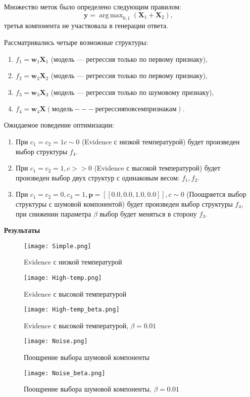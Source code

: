 \documentclass[12pt]{article}
\DeclareMathOperator*{\argmax}{arg\,max}
\begin{document}
Множество меток было определено следующим правилом:
\[
    \mathbf{y}= \argmax_{0,1} (\mathbf{X}_1 + \mathbf{X}_2),
\]
третья компонента не участвовала в генерации ответа.

Рассматривались четыре возможные структуры:
\begin{enumerate}
\item $f_1 = \mathbf{w}_1 \mathbf{X}_1$ (модель --- регрессия только по первому признаку), 

\item $f_2 = \mathbf{w}_2 \mathbf{X}_2$ (модель --- регрессия только по первому признаку), 

\item $f_3 = \mathbf{w}_3 \mathbf{X}_3$ (модель --- регрессия только по шумовому признаку), 

\item $f_4 = \mathbf{w}_4 \mathbf{X} (модель --- регрессия по всем признакам). $
\end{enumerate}

Ожидаемое поведение оптимизации:
\begin{enumerate}
\item При $c_1 = c_2 = 1 c \sim 0$ (Evidence с низкой температурой) будет произведен выбор структуры $f_4$.

\item При $c_1 = c_2 = 1, c >>0$ (Evidence с высокой температурой) будет произведен выбор двух структур с одинаковым весом: $f_1, f_2$.

\item При $c_1 = c_2 = 0, c_3 = 1, \mathbf{p}= [[0.0, 0.0, 1.0, 0.0]], c \sim 0$ (Поощряется выбор структуры с шумовой компонентой) будет произведен выбор структуры $f_4$, при снижении параметра $\beta$ выбор будет меняться в сторону $f_3$.
\end{enumerate}

\textbf{Результаты}\\
\begin{figure}
\texttt{[image: Simple.png]}
\caption{Evidence с низкой температурой}
\end{figure}

\begin{figure}
\texttt{[image: High-temp.png]}
\caption{Evidence с высокой температурой}
\end{figure}


\begin{figure}
\texttt{[image: High-temp\_beta.png]}
\caption{Evidence с высокой температурой, $\beta = 0.01$}
\end{figure}


\begin{figure}
\texttt{[image: Noise.png]}
\caption{Поощрение выбора шумовой компоненты}
\end{figure}


\begin{figure}
\texttt{[image: Noise\_beta.png]}
\caption{Поощрение выбора шумовой компоненты, $\beta = 0.01$}
\end{figure}
\end{document}
